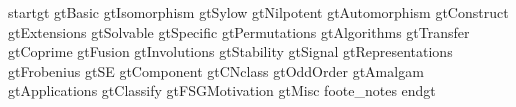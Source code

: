  {startgt}
 {gtBasic}
 {gtIsomorphism}
 {gtSylow}
 {gtNilpotent}
 {gtAutomorphism}
 {gtConstruct}
 {gtExtensions}
 {gtSolvable}
 {gtSpecific}
 {gtPermutations}
 {gtAlgorithms}
 {gtTransfer}
 {gtCoprime}
 {gtFusion}
 {gtInvolutions}
 {gtStability}
 {gtSignal}
 {gtRepresentations}
 {gtFrobenius}
 {gtSE}
 {gtComponent}
 {gtCNclass}
 {gtOddOrder}
 {gtAmalgam}
 {gtApplications}
 {gtClassify}
 {gtFSGMotivation}
 {gtMisc}
 {foote_notes}
 {endgt}

